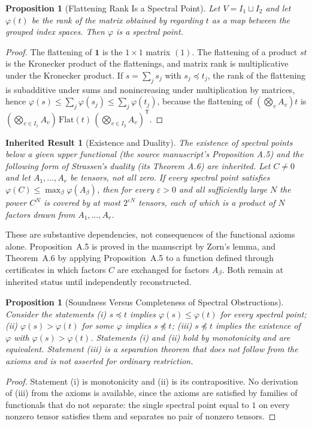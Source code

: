 \documentclass[11pt,letterpaper]{report}
\theoremstyle{plain}
\newtheorem{proposition}[theorem]{Proposition}
\newtheorem{inherited}[theorem]{Inherited Result}
\theoremstyle{definition}
\theoremstyle{remark}
\begin{document}
\begin{proposition}[Flattening Rank Is a Spectral Point]
Let $V=I_1\sqcup I_2$ and let $\varphi(t)$ be the rank of the matrix obtained by regarding $t$ as a map between the grouped index spaces. Then $\varphi$ is a spectral point.
\end{proposition}
\begin{proof}
The flattening of $\mathbf 1$ is the $1\times1$ matrix $(1)$. The flattening of a product $st$ is the Kronecker product of the flattenings, and matrix rank is multiplicative under the Kronecker product. If $s=\sum_js_j$ with $s_j\preceq t_j$, the rank of the flattening is subadditive under sums and nonincreasing under multiplication by matrices, hence $\varphi(s)\le\sum_j\varphi(s_j)\le\sum_j\varphi(t_j)$, because the flattening of $(\bigotimes_vA_v)t$ is $(\bigotimes_{v\in I_1}A_v)\,\mathrm{Flat}(t)\,(\bigotimes_{v\in I_2}A_v)^{\mathsf T}$.
\end{proof}

\begin{inherited}[Existence and Duality]\label{inh:duality}
The existence of spectral points below a given upper functional (the source manuscript's Proposition A.5) and the following form of Strassen's duality (its Theorem A.6) are inherited. Let $C\ne0$ and let $A_1,\ldots,A_r$ be tensors, not all zero. If every spectral point satisfies $\varphi(C)\le\max_\beta\varphi(A_\beta)$, then for every $\varepsilon>0$ and all sufficiently large $N$ the power $C^{N}$ is covered by at most $2^{\varepsilon N}$ tensors, each of which is a product of $N$ factors drawn from $A_1,\ldots,A_r$.
\end{inherited}

These are substantive dependencies, not consequences of the functional axioms alone. Proposition~A.5 is proved in the manuscript by Zorn's lemma, and Theorem~A.6 by applying Proposition~A.5 to a function defined through certificates in which factors $C$ are exchanged for factors $A_\beta$. Both remain at inherited status until independently reconstructed.

\begin{proposition}[Soundness Versus Completeness of Spectral Obstructions]
Consider the statements (i) $s\preceq t$ implies $\varphi(s)\le\varphi(t)$ for every spectral point; (ii) $\varphi(s)>\varphi(t)$ for some $\varphi$ implies $s\not\preceq t$; (iii) $s\not\preceq t$ implies the existence of $\varphi$ with $\varphi(s)>\varphi(t)$. Statements (i) and (ii) hold by monotonicity and are equivalent. Statement (iii) is a separation theorem that does not follow from the axioms and is not asserted for ordinary restriction.
\end{proposition}
\begin{proof}
Statement (i) is monotonicity and (ii) is its contrapositive. No derivation of (iii) from the axioms is available, since the axioms are satisfied by families of functionals that do not separate: the single spectral point equal to $1$ on every nonzero tensor satisfies them and separates no pair of nonzero tensors.
\end{proof}
\end{document}
